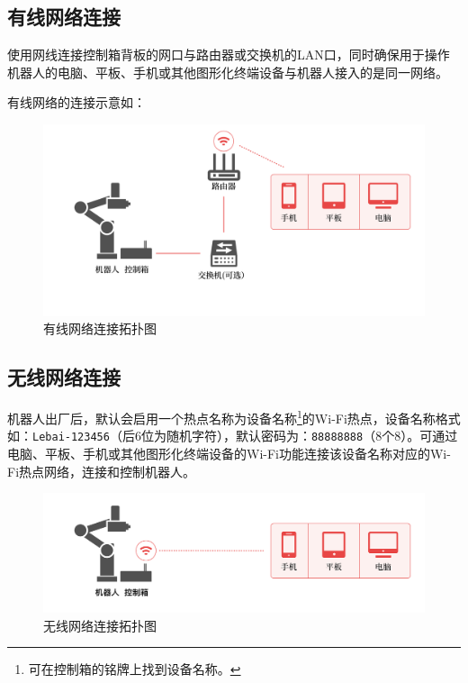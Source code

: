 \subsection{有线网络连接}

使用网线连接控制箱背板的网口与路由器或交换机的LAN口，同时确保用于操作机器人的电脑、平板、手机或其他图形化终端设备与机器人接入的是同一网络。

有线网络的连接示意如：

\begin{figure}[ht]
    \centering
    \includegraphics[width=\textwidth]{image/network-1.pdf}
    \caption{有线网络连接拓扑图}
    \label{fig:有线网络连接拓扑图}
\end{figure}

\clearpage

\subsection{无线网络连接}
机器人出厂后，默认会启用一个热点名称为设备名称\footnote{可在控制箱的铭牌上找到设备名称。}的Wi-Fi热点，设备名称格式如：\verb|Lebai-123456|（后6位为随机字符），默认密码为：\verb|88888888|（8个8）。可通过电脑、平板、手机或其他图形化终端设备的Wi-Fi功能连接该设备名称对应的Wi-Fi热点网络，连接和控制机器人。

\begin{figure}[ht]
    \centering
    \includegraphics[width=\textwidth]{image/network-2.pdf}
    \caption{无线网络连接拓扑图}
    \label{fig:无线网络连接拓扑图}
\end{figure}

